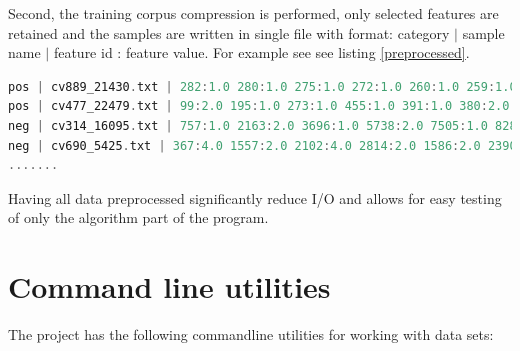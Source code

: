 \documentclass{report}
\begin{document}
Second, the training corpus compression is performed, only selected features are retained and the samples are written in single file with format: category $|$ sample name $|$ feature id : feature value. For example see  see listing \ref{preprocessed}.

\begin{lstlisting}[language=scala, caption={Preprocessed samples}, label={preprocessed}]
pos | cv889_21430.txt | 282:1.0 280:1.0 275:1.0 272:1.0 260:1.0 259:1.0 258:1.0 256:2.0
pos | cv477_22479.txt | 99:2.0 195:1.0 273:1.0 455:1.0 391:1.0 380:2.0 376:2.0 178:1.0
neg | cv314_16095.txt | 757:1.0 2163:2.0 3696:1.0 5738:2.0 7505:1.0 8286:1.0 3181:1.0
neg | cv690_5425.txt | 367:4.0 1557:2.0 2102:4.0 2814:2.0 1586:2.0 23901:2.0 8:7.0
.......
\end{lstlisting}

Having all data preprocessed significantly reduce I/O and allows for easy testing of only the algorithm part of the program.

\section{Command line utilities}

The project has the following commandline utilities for working with data sets:
\end{document}
